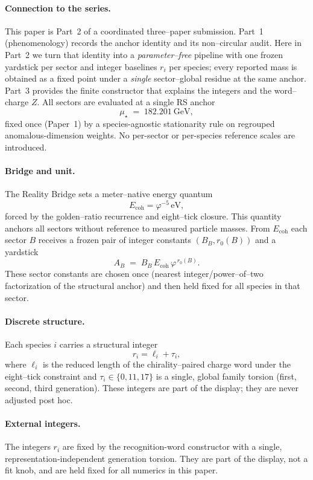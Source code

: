 \documentclass[epjc3]{svjour3}
\begin{document}
\paragraph{Connection to the series.}
This paper is Part~2 of a coordinated three--paper submission. Part~1 (phenomenology) records the anchor identity and its non--circular audit. Here in Part~2 we turn that identity into a \emph{parameter--free} pipeline with one frozen yardstick per sector and integer baselines $r_i$ per species; every reported mass is obtained as a fixed point under a \emph{single} sector--global residue at the same anchor. Part~3 provides the finite constructor that explains the integers and the word--charge $Z$.
All sectors are evaluated at a single RS anchor
\[
\mu_\star \;=\; 182.201~\mathrm{GeV},
\]
fixed once (Paper~1) by a species-agnostic stationarity rule on regrouped anomalous-dimension weights. No per-sector or per-species reference scales are introduced.

\paragraph{Bridge and unit.}
The Reality Bridge sets a meter–native energy quantum
\[
E_{\mathrm{coh}}=\varphi^{-5}\,\mathrm{eV},
\]
forced by the golden–ratio recurrence and eight–tick closure. This quantity anchors all sectors without reference to measured particle masses. From $E_{\mathrm{coh}}$ each sector $B$ receives a frozen pair of integer constants $(B_B,r_0(B))$ and a yardstick
\[
A_B \;=\; B_B\,E_{\mathrm{coh}}\,\varphi^{\,r_0(B)}.
\]
These sector constants are chosen once (nearest integer/power–of–two factorization of the structural anchor) and then held fixed for all species in that sector.

\paragraph{Discrete structure.}
Each species $i$ carries a structural integer
\[
r_i=\ell_i+\tau_i,
\]
where $\ell_i$ is the reduced length of the chirality–paired charge word under the eight–tick constraint and $\tau_i\in\{0,11,17\}$ is a single, global family torsion (first, second, third generation). These integers are part of the display; they are never adjusted post hoc.

\paragraph{External integers.}
The integers $r_i$ are fixed by the recognition-word constructor with a single, representation-independent generation torsion. They are part of the display, not a fit knob, and are held fixed for all numerics in this paper.
\end{document}

